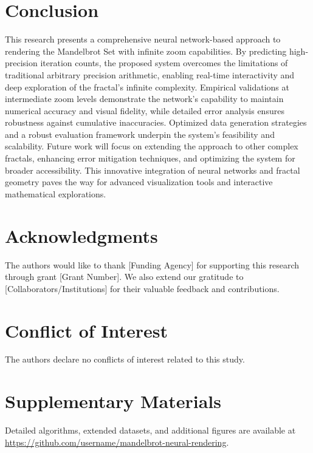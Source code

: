 \documentclass[journal]{IEEEaccess}
\begin{document}
\section{Conclusion}
\label{sec:conclusion}
This research presents a comprehensive neural network-based approach to rendering the Mandelbrot Set with infinite zoom capabilities. By predicting high-precision iteration counts, the proposed system overcomes the limitations of traditional arbitrary precision arithmetic, enabling real-time interactivity and deep exploration of the fractal's infinite complexity. Empirical validations at intermediate zoom levels demonstrate the network's capability to maintain numerical accuracy and visual fidelity, while detailed error analysis ensures robustness against cumulative inaccuracies. Optimized data generation strategies and a robust evaluation framework underpin the system's feasibility and scalability. Future work will focus on extending the approach to other complex fractals, enhancing error mitigation techniques, and optimizing the system for broader accessibility. This innovative integration of neural networks and fractal geometry paves the way for advanced visualization tools and interactive mathematical explorations.

\section*{Acknowledgments}
The authors would like to thank [Funding Agency] for supporting this research through grant [Grant Number]. We also extend our gratitude to [Collaborators/Institutions] for their valuable feedback and contributions.

\section*{Conflict of Interest}
The authors declare no conflicts of interest related to this study.

\appendices
\section*{Supplementary Materials}
Detailed algorithms, extended datasets, and additional figures are available at \url{https://github.com/username/mandelbrot-neural-rendering}.
\end{document}
